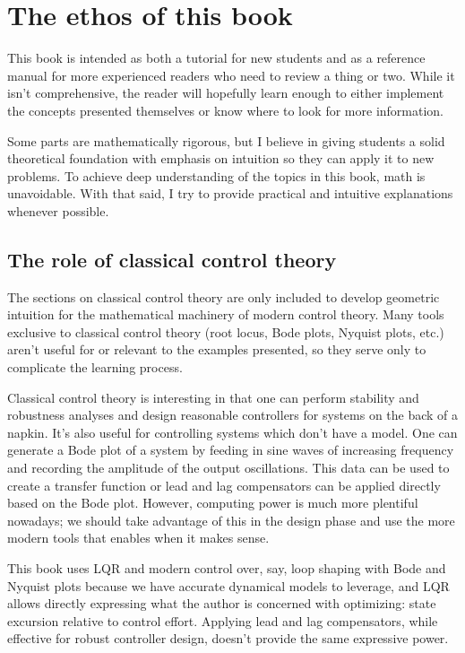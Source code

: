 \section{The ethos of this book}

This book is intended as both a tutorial for new students and as a reference
manual for more experienced readers who need to review a thing or two. While it
isn't comprehensive, the reader will hopefully learn enough to either implement
the concepts presented themselves or know where to look for more information.

Some parts are mathematically rigorous, but I believe in giving students a solid
theoretical foundation with emphasis on intuition so they can apply it to new
problems. To achieve deep understanding of the topics in this book, math is
unavoidable. With that said, I try to provide practical and intuitive
explanations whenever possible.

\subsection{The role of classical control theory}

The sections on classical control theory are only included to develop geometric
intuition for the mathematical machinery of modern control theory. Many tools
exclusive to classical control theory (root locus, Bode plots, Nyquist plots,
etc.) aren't useful for or relevant to the examples presented, so they serve
only to complicate the learning process.

Classical control theory is interesting in that one can perform stability and
robustness analyses and design reasonable controllers for systems on the back of
a napkin. It's also useful for controlling systems which don't have a model. One
can generate a Bode plot of a system by feeding in sine waves of increasing
frequency and recording the amplitude of the output oscillations. This data can
be used to create a transfer function or lead and lag compensators can be
applied directly based on the Bode plot. However, computing power is much more
plentiful nowadays; we should take advantage of this in the design phase and use
the more modern tools that enables when it makes sense.

This book uses LQR and modern control over, say, loop shaping with Bode and
Nyquist plots because we have accurate dynamical models to leverage, and LQR
allows directly expressing what the author is concerned with optimizing: state
excursion relative to control effort. Applying lead and lag compensators, while
effective for robust controller design, doesn't provide the same expressive
power.

